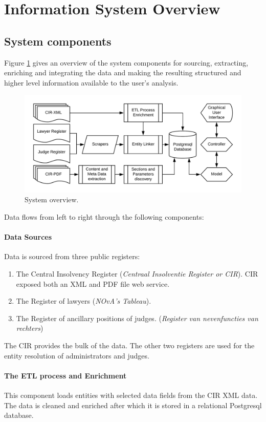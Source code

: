 \section{Information System Overview}
\subsection{System components}
Figure \ref{System overview} gives an overview of the system components for sourcing, extracting, enriching and integrating the  data and making the resulting structured and higher level information available to the user's analysis.

\begin{figure}[h]
\includegraphics[width=1\linewidth]{images/system_overview.png}
\caption{System overview.}\label{System overview}
\end{figure}

Data flows from left to right through the following components:
\paragraph{Data Sources} Data is sourced from three public registers:
\begin{enumerate}
	\item The Central Insolvency Register (\textit{Centraal Insolventie Register or CIR}). CIR exposed both an XML and PDF file web service.
	\item The Register of lawyers (\textit{NOvA's Tableau}).
	\item The Register of ancillary positions of judges. (\textit{Register van nevenfuncties van rechters}) 
\end{enumerate}
The CIR provides the bulk of the data. The other two registers are used for the entity resolution of administrators and judges.

\paragraph{The ETL process and Enrichment} This component loads entities with selected data fields from the CIR XML data. The data is cleaned and enriched after which it is stored in a relational Postgresql database.

